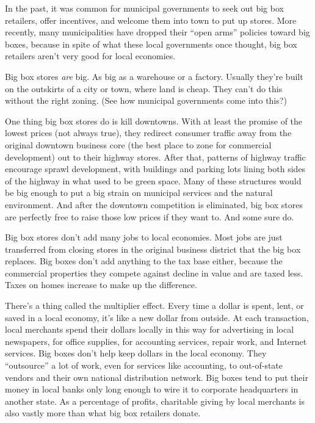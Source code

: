 In the past, it was common for municipal governments to seek out big box retailers, offer incentives, and welcome them into town to put up stores.  More recently, many municipalities have dropped their ``open arms'' policies toward big boxes, because in spite of what these local governments once thought, big box retailers aren't very good for local economies.


Big box stores {\em are} big.  As big as a warehouse or a factory.  Usually they're built on the outskirts of a city or town, where land is cheap.  They can't do this without the right zoning.  (See how municipal governments come into this?)

One thing big box stores do is kill downtowns.  With at least the promise of the lowest prices (not always true), they redirect consumer traffic away from the original downtown business core (the best place to zone for commercial development) out to their highway stores.  After that, patterns of highway traffic encourage sprawl development, with buildings and parking lots lining both sides of the highway in what used to be green space.  Many of these structures would be big enough to put a big strain on municipal services and the natural environment.  And after the downtown competition is eliminated, big box stores are perfectly free to raise those low prices if they want to.  And some sure do.

\vspace{6.5pt}

Big box stores don't add many jobs to local economies.  Most jobs are just transferred from closing stores in the original business district that the big box replaces.  Big boxes don't add anything to the tax base either, because the commercial properties they compete against decline in value and are taxed less.  Taxes on homes increase to make up the difference.

\vspace{6.5pt}

There's a thing called the multiplier effect.  Every time a dollar is spent, lent, or saved in a local economy, it's like a new dollar from outside.  At each transaction, local merchants spend their dollars locally in this way for advertising in local newspapers, for office supplies, for accounting services, repair work, and Internet services.  Big boxes don't help keep dollars in the local economy.  They ``outsource'' a lot of work, even for services like accounting, to out-of-state vendors and their own national distribution network.  Big boxes tend to put their money in local banks only long enough to wire it to corporate headquarters in another state.  As a percentage of profits, charitable giving by local merchants is also vastly more than what big box retailers donate.


